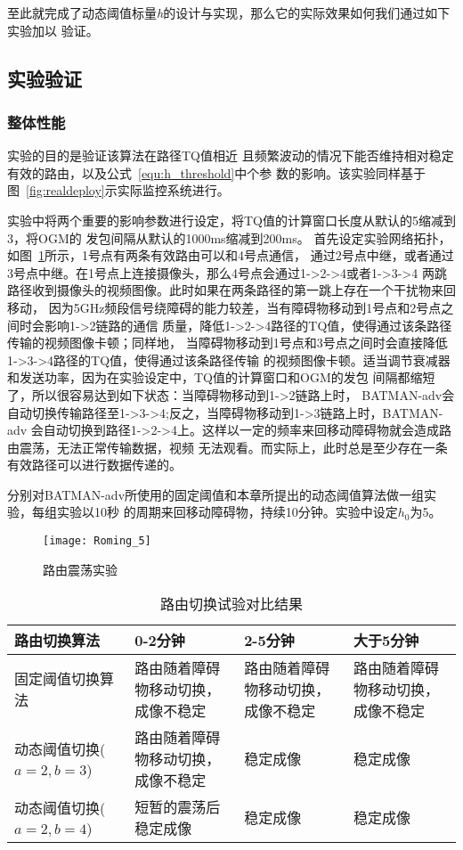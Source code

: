 至此就完成了动态阈值标量\emph{h}的设计与实现，那么它的实际效果如何我们通过如下实验加以
验证。

\subsection{实验验证}
\renewcommand{\thesubsubsection}{\Alph{subsubsection}.}
\subsubsection{整体性能}
实验的目的是验证该算法在路径TQ值相近
且频繁波动的情况下能否维持相对稳定有效的路由，以及公式~\ref{equ:h_threshold}中个参
数的影响。该实验同样基于图~\ref{fig:realdeploy}示实际监控系统进行。

实验中将两个重要的影响参数进行设定，将TQ值的计算窗口长度从默认的5缩减到3，将OGM的
发包间隔从默认的1000ms缩减到200ms。
首先设定实验网络拓扑，如图~\ref{fig:roming_5}所示，1号点有两条有效路由可以和4号点通信，
通过2号点中继，或者通过3号点中继。在1号点上连接摄像头，那么4号点会通过1->2->4或者1->3->4
两跳路径收到摄像头的视频图像。此时如果在两条路径的第一跳上存在一个干扰物来回移动，
因为5GHz频段信号绕障碍的能力较差，当有障碍物移动到1号点和2号点之间时会影响1->2链路的通信
质量，降低1->2->4路径的TQ值，使得通过该条路径传输的视频图像卡顿；同样地，
当障碍物移动到1号点和3号点之间时会直接降低1->3->4路径的TQ值，使得通过该条路径传输
的视频图像卡顿。适当调节衰减器和发送功率，因为在实验设定中，TQ值的计算窗口和OGM的发包
间隔都缩短了，所以很容易达到如下状态：当障碍物移动到1->2链路上时，
BATMAN-adv会自动切换传输路径至1->3->4;反之，当障碍物移动到1->3链路上时，BATMAN-adv
会自动切换到路径1->2->4上。这样以一定的频率来回移动障碍物就会造成路由震荡，无法正常传输数据，视频
无法观看。而实际上，此时总是至少存在一条有效路径可以进行数据传递的。

分别对BATMAN-adv所使用的固定阈值和本章所提出的动态阈值算法做一组实验，每组实验以10秒
的周期来回移动障碍物，持续10分钟。实验中设定$h_{0}$为5。

\begin{figure}[H] %
  \centering
  \texttt{[image: Roming\_5]}
  \caption{路由震荡实验}
  \label{fig:roming_5}
\end{figure}

\begin{table}[htbp]
  \centering
  \caption{路由切换试验对比结果}
  \label{tab:roming_tab_1}
  \begin{tabular}{|p{3cm}|p{3cm}|p{3cm}|p{3cm}|}
  \hline
  路由切换算法 & 0-2分钟 & 2-5分钟 & 大于5分钟 \\
  \hline
  固定阈值切换算法 & 路由随着障碍物移动切换，成像不稳定 & 路由随着障碍物移动切换，成像不稳定& 路由随着障碍物移动切换，成像不稳定\\
  \hline
  动态阈值切换($a=2, b=3$) & 路由随着障碍物移动切换，成像不稳定 & 稳定成像 & 稳定成像\\
  \hline
  动态阈值切换($a=2, b=4$) & 短暂的震荡后稳定成像 & 稳定成像 & 稳定成像\\
  \hline
  \end{tabular}
\end{table}

